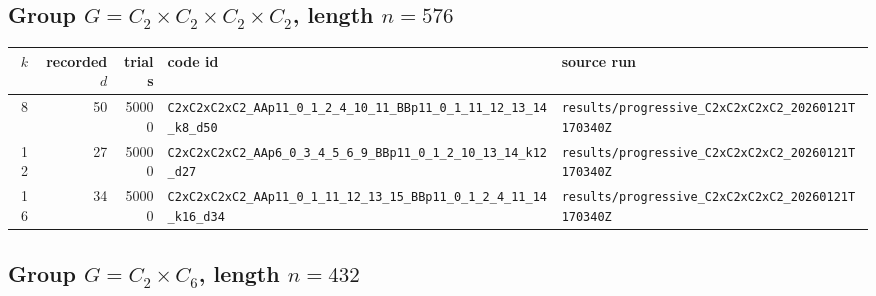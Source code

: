 \documentclass[11pt]{article}
\begin{document}
\subsection{Group $G = C_{2} \times C_{2} \times C_{2} \times C_{2}$, length $n=576$}

\begin{longtable}{@{}r r r l l@{}}
\toprule
$k$ & recorded $d$ & trials & code id & source run \\
\midrule
\endhead
8 & 50 & 50000 & \texttt{C2xC2xC2xC2\_AAp11\_0\_1\_2\_4\_10\_11\_BBp11\_0\_1\_11\_12\_13\_14\_k8\_d50} & \texttt{results/progressive\_C2xC2xC2xC2\_20260121T170340Z} \\
12 & 27 & 50000 & \texttt{C2xC2xC2xC2\_AAp6\_0\_3\_4\_5\_6\_9\_BBp11\_0\_1\_2\_10\_13\_14\_k12\_d27} & \texttt{results/progressive\_C2xC2xC2xC2\_20260121T170340Z} \\
16 & 34 & 50000 & \texttt{C2xC2xC2xC2\_AAp11\_0\_1\_11\_12\_13\_15\_BBp11\_0\_1\_2\_4\_11\_14\_k16\_d34} & \texttt{results/progressive\_C2xC2xC2xC2\_20260121T170340Z} \\
\bottomrule
\end{longtable}

\subsection{Group $G = C_{2} \times C_{6}$, length $n=432$}
\end{document}
